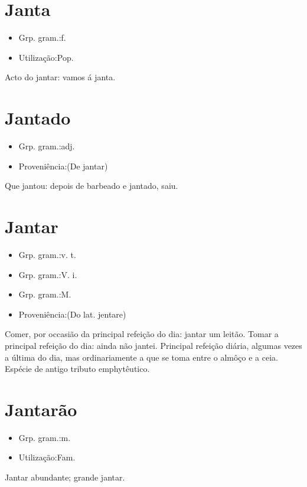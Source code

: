 \documentclass{article}
\begin{document}
\section{Janta}
\begin{itemize}
\item {Grp. gram.:f.}
\end{itemize}
\begin{itemize}
\item {Utilização:Pop.}
\end{itemize}
Acto do jantar: \textunderscore vamos á janta\textunderscore .
\section{Jantado}
\begin{itemize}
\item {Grp. gram.:adj.}
\end{itemize}
\begin{itemize}
\item {Proveniência:(De \textunderscore jantar\textunderscore )}
\end{itemize}
Que jantou: \textunderscore depois de barbeado e jantado, saiu\textunderscore .
\section{Jantar}
\begin{itemize}
\item {Grp. gram.:v. t.}
\end{itemize}
\begin{itemize}
\item {Grp. gram.:V. i.}
\end{itemize}
\begin{itemize}
\item {Grp. gram.:M.}
\end{itemize}
\begin{itemize}
\item {Proveniência:(Do lat. \textunderscore jentare\textunderscore )}
\end{itemize}
Comer, por occasião da principal refeição do dia: \textunderscore jantar um leitão\textunderscore .
Tomar a principal refeição do dia: \textunderscore ainda não jantei\textunderscore .
Principal refeição diária, algumas vezes a última do dia, mas ordinariamente a que se toma entre o almôço e a ceia.
Espécie de antigo tributo emphytêutico.
\section{Jantarão}
\begin{itemize}
\item {Grp. gram.:m.}
\end{itemize}
\begin{itemize}
\item {Utilização:Fam.}
\end{itemize}
Jantar abundante; grande jantar.
\end{document}
